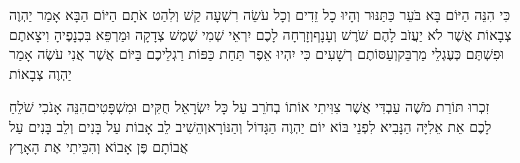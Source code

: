 \documentclass[../main/main.tex]{subfiles}
\begin{document}
\begin{multicols}{\ncols}
כִּי הִנֵּה הַיּוֹם בָּא בֹּעֵר כַּתַּנּוּר וְהָיוּ כָל זֵדִים וְכָל עֹשֵׂה רִשְׁעָה קַשׁ וְלִהַט אֹתָם הַיּוֹם הַבָּא אָמַר יַהְוֶה צְבָאוֹת אֲשֶׁר לֹא יַעֲזֹב לָהֶם שֹׁרֶשׁ וְעָנָף\PreVerseSpace{}וְזָרְחָה לָכֶם יִרְאֵי שְׁמִי שֶׁמֶשׁ צְדָקָה וּמַרְפֵּא בִּכְנָפֶיהָ וִיצָאתֶם וּפִשְׁתֶּם כְּעֶגְלֵי מַרְבֵּק\PreVerseSpace{}וְעַסּוֹתֶם רְשָׁעִים כִּי יִהְיוּ אֵפֶר תַּחַת כַּפּוֹת רַגְלֵיכֶם בַּיּוֹם אֲשֶׁר אֲנִי עֹשֶׂה אָמַר יַהְוֶה צְבָאוֹת\OpenSection{}\par
{}זִכְרוּ תּוֹרַת מֹשֶׁה עַבְדִּי אֲשֶׁר צִוִּיתִי אוֹתוֹ בְחֹרֵב עַל כָּל יִשְׂרָאֵל חֻקִּים וּמִשְׁפָּטִים\PreVerseSpace{}הִנֵּה אָנֹכִי שֹׁלֵחַ לָכֶם אֵת אֵלִיָּה הַנָּבִיא לִפְנֵי בּוֹא יוֹם יַהְוֶה הַגָּדוֹל וְהַנּוֹרָא\PreVerseSpace{}וְהֵשִׁיב לֵב אָבוֹת עַל בָּנִים וְלֵב בָּנִים עַל אֲבוֹתָם פֶּן אָבוֹא וְהִכֵּיתִי אֶת הָאָרֶץ\par
\pagebreak
\end{multicols}
\end{document}
